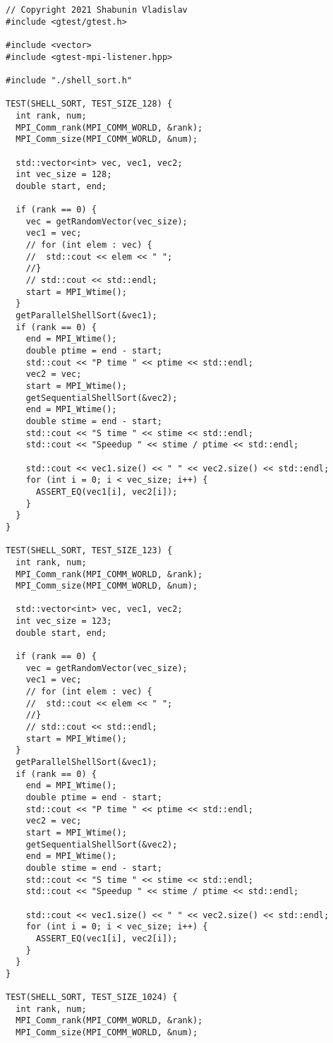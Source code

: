 \documentclass{report}
\begin{document}
\begin{lstlisting}
// Copyright 2021 Shabunin Vladislav
#include <gtest/gtest.h>

#include <vector>
#include <gtest-mpi-listener.hpp>

#include "./shell_sort.h"

TEST(SHELL_SORT, TEST_SIZE_128) {
  int rank, num;
  MPI_Comm_rank(MPI_COMM_WORLD, &rank);
  MPI_Comm_size(MPI_COMM_WORLD, &num);

  std::vector<int> vec, vec1, vec2;
  int vec_size = 128;
  double start, end;

  if (rank == 0) {
    vec = getRandomVector(vec_size);
    vec1 = vec;
    // for (int elem : vec) {
    //  std::cout << elem << " ";
    //}
    // std::cout << std::endl;
    start = MPI_Wtime();
  }
  getParallelShellSort(&vec1);
  if (rank == 0) {
    end = MPI_Wtime();
    double ptime = end - start;
    std::cout << "P time " << ptime << std::endl;
    vec2 = vec;
    start = MPI_Wtime();
    getSequentialShellSort(&vec2);
    end = MPI_Wtime();
    double stime = end - start;
    std::cout << "S time " << stime << std::endl;
    std::cout << "Speedup " << stime / ptime << std::endl;

    std::cout << vec1.size() << " " << vec2.size() << std::endl;
    for (int i = 0; i < vec_size; i++) {
      ASSERT_EQ(vec1[i], vec2[i]);
    }
  }
}

TEST(SHELL_SORT, TEST_SIZE_123) {
  int rank, num;
  MPI_Comm_rank(MPI_COMM_WORLD, &rank);
  MPI_Comm_size(MPI_COMM_WORLD, &num);

  std::vector<int> vec, vec1, vec2;
  int vec_size = 123;
  double start, end;

  if (rank == 0) {
    vec = getRandomVector(vec_size);
    vec1 = vec;
    // for (int elem : vec) {
    //  std::cout << elem << " ";
    //}
    // std::cout << std::endl;
    start = MPI_Wtime();
  }
  getParallelShellSort(&vec1);
  if (rank == 0) {
    end = MPI_Wtime();
    double ptime = end - start;
    std::cout << "P time " << ptime << std::endl;
    vec2 = vec;
    start = MPI_Wtime();
    getSequentialShellSort(&vec2);
    end = MPI_Wtime();
    double stime = end - start;
    std::cout << "S time " << stime << std::endl;
    std::cout << "Speedup " << stime / ptime << std::endl;

    std::cout << vec1.size() << " " << vec2.size() << std::endl;
    for (int i = 0; i < vec_size; i++) {
      ASSERT_EQ(vec1[i], vec2[i]);
    }
  }
}

TEST(SHELL_SORT, TEST_SIZE_1024) {
  int rank, num;
  MPI_Comm_rank(MPI_COMM_WORLD, &rank);
  MPI_Comm_size(MPI_COMM_WORLD, &num);


\end{lstlisting}
\end{document}
